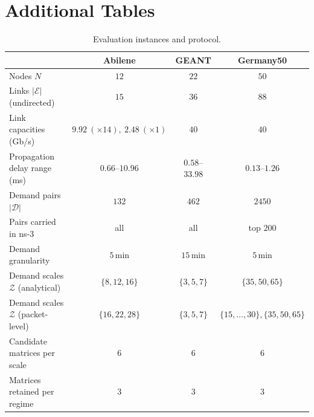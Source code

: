 \section{Additional Tables}
\label{app:instances}

\begin{table}[h]
\centering
\small
\caption{Evaluation instances and protocol.}
\label{tab:eval-setup}
\begin{tabular}{lccc}
\hline
& Abilene & GEANT & Germany50 \\
\hline
Nodes $N$ & $12$ & $22$ & $50$ \\
Links $|\mathcal{E}|$ (undirected) & $15$ & $36$ & $88$ \\
Link capacities (Gb/s) & $9.92\ (\times 14),\ 2.48\ (\times 1)$ & $40$ & $40$ \\
Propagation delay range (ms) & $0.66$--$10.96$ & $0.58$--$33.98$ & $0.13$--$1.26$ \\
Demand pairs $|\mathcal{D}|$ & $132$ & $462$ & $2450$ \\
Pairs carried in ns-3 & all & all & top $200$ \\
Demand granularity & $5$\,min & $15$\,min & $5$\,min \\
\hline
Demand scales $\mathcal{Z}$ (analytical) & $\{8,12,16\}$ & $\{3,5,7\}$ & $\{35,50,65\}$ \\
Demand scales $\mathcal{Z}$ (packet-level) & $\{16,22,28\}$ & $\{3,5,7\}$ & $\{15,\dots,30\},\{35,50,65\}$ \\
Candidate matrices per scale & $6$ & $6$ & $6$ \\
Matrices retained per regime & $3$ & $3$ & $3$ \\
\hline
\end{tabular}
\end{table}




